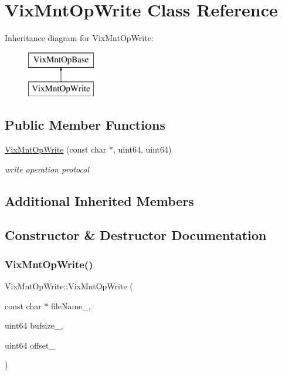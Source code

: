 \hypertarget{class_vix_mnt_op_write}{}\section{Vix\+Mnt\+Op\+Write Class Reference}
\label{class_vix_mnt_op_write}
Inheritance diagram for Vix\+Mnt\+Op\+Write\+:\begin{figure}[H]
\begin{center}
\leavevmode
\includegraphics[height=2.000000cm]{class_vix_mnt_op_write}
\end{center}
\end{figure}
\subsection*{Public Member Functions}
\begin{DoxyCompactItemize}
\item 
\hyperlink{class_vix_mnt_op_write_a320fdf810c2f79b643837ecfdece73c4}{Vix\+Mnt\+Op\+Write} (const char $\ast$, uint64, uint64)
\begin{DoxyCompactList}\small\item\em write operation protocol \end{DoxyCompactList}\end{DoxyCompactItemize}
\subsection*{Additional Inherited Members}


\subsection{Constructor \& Destructor Documentation}
\hypertarget{class_vix_mnt_op_write_a320fdf810c2f79b643837ecfdece73c4}{}\label{class_vix_mnt_op_write_a320fdf810c2f79b643837ecfdece73c4} 
\subsubsection{\texorpdfstring{Vix\+Mnt\+Op\+Write()}{VixMntOpWrite()}}
{\ttfamily Vix\+Mnt\+Op\+Write\+::\+Vix\+Mnt\+Op\+Write (\begin{DoxyParamCaption}\item[{const char $\ast$}]{file\+Name\+\_\+,  }\item[{uint64}]{bufsize\+\_\+,  }\item[{uint64}]{offset\+\_\+ }\end{DoxyParamCaption})\hspace{0.3cm}{\ttfamily [explicit]}}



